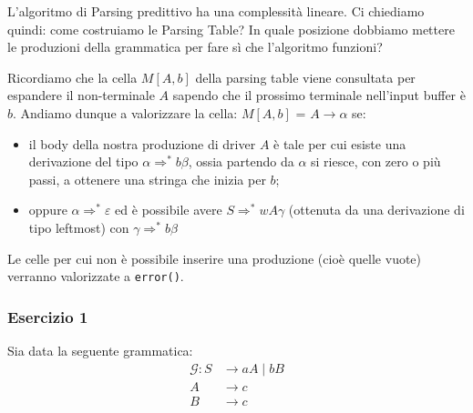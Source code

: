 \documentclass[class=book, crop=false, oneside, 12pt]{standalone}
\begin{document}
L'algoritmo di Parsing predittivo ha una complessità lineare. Ci chiediamo quindi: come costruiamo le Parsing Table? In quale posizione dobbiamo mettere le produzioni della grammatica per fare sì che l'algoritmo funzioni?

Ricordiamo che la cella \(M[A, b]\) della parsing table viene consultata per espandere il non-terminale \(A\) sapendo che il prossimo terminale nell'input buffer è \(b\). Andiamo dunque a valorizzare la cella: \(M[A, b]\) = \(A \rightarrow \alpha\) se:

\begin{itemize}
    \item il body della nostra produzione di driver \(A\) è tale per cui esiste una derivazione del tipo \(\alpha \Rightarrow^* b \beta\), ossia partendo da \(\alpha\) si riesce, con zero o più passi, a ottenere una stringa che inizia per \(b\);
    \item oppure \(\alpha \Rightarrow^* \varepsilon\) ed è possibile avere \(S \Rightarrow^* w A \gamma\) (ottenuta da una derivazione di tipo leftmost) con \(\gamma \Rightarrow^* b \beta\)
\end{itemize}

Le celle per cui non è possibile inserire una produzione (cioè quelle vuote) verranno valorizzate a \texttt{error()}.

\subsubsection{Esercizio 1}

Sia data la seguente grammatica:
\begin{align*}
    \mathcal{G}: S &\rightarrow aA \mid bB \\
    A &\rightarrow c \\
    B &\rightarrow c
\end{align*}
\end{document}
